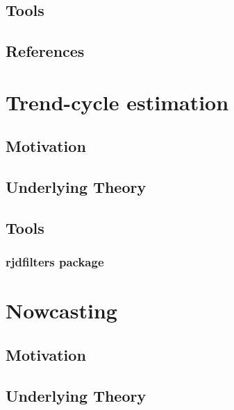 \documentclass[
  letterpaper,
  DIV=11,
  numbers=noendperiod]{scrreprt}
\begin{document}
\hypertarget{tools-2}{%
\section{Tools}\label{tools-2}}

\hypertarget{references}{%
\section{References}\label{references}}

\hypertarget{trend-cycle-estimation-1}{%
\chapter{Trend-cycle estimation}\label{trend-cycle-estimation-1}}

\hypertarget{motivation-4}{%
\section{Motivation}\label{motivation-4}}

\hypertarget{underlying-theory-2}{%
\section{Underlying Theory}\label{underlying-theory-2}}

\hypertarget{tools-3}{%
\section{Tools}\label{tools-3}}

\hypertarget{rjdfilters-package}{%
\subsection{rjdfilters package}\label{rjdfilters-package}}

\hypertarget{nowcasting}{%
\chapter{Nowcasting}\label{nowcasting}}

\hypertarget{motivation-5}{%
\section{Motivation}\label{motivation-5}}

\hypertarget{underlying-theory-3}{%
\section{Underlying Theory}\label{underlying-theory-3}}
\end{document}
